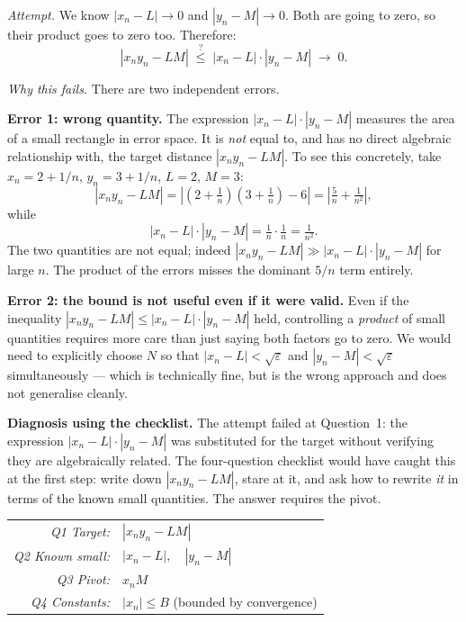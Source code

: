 \begin{tcolorbox}[colback=red!4, colframe=red!40, arc=2pt,
  left=8pt, right=8pt, top=6pt, bottom=6pt,
  title={\small\textbf{First attempt (incorrect)}},
  fonttitle=\small\bfseries]
\textit{Attempt.}
We know $|x_n - L| \to 0$ and $|y_n - M| \to 0$.
Both are going to zero, so their product goes to zero too.
Therefore:
\[
  |x_n y_n - LM| \;\stackrel{?}{\le}\; |x_n - L| \cdot |y_n - M| \;\to\; 0.
\]

\medskip

\textit{Why this fails.}
There are two independent errors.

\textbf{Error 1: wrong quantity.}
The expression $|x_n - L| \cdot |y_n - M|$ measures the area of
a small rectangle in error space.
It is \emph{not} equal to, and has no direct algebraic relationship with,
the target distance $|x_n y_n - LM|$.
To see this concretely, take $x_n = 2 + 1/n$, $y_n = 3 + 1/n$,
$L = 2$, $M = 3$:
\[
  |x_n y_n - LM|
  = \left|(2+\tfrac{1}{n})(3+\tfrac{1}{n}) - 6\right|
  = \left|\tfrac{5}{n} + \tfrac{1}{n^2}\right|,
\]
while
\[
  |x_n - L|\cdot|y_n - M| = \tfrac{1}{n} \cdot \tfrac{1}{n} = \tfrac{1}{n^2}.
\]
The two quantities are not equal; indeed $|x_n y_n - LM| \gg |x_n - L|\cdot|y_n - M|$
for large $n$.
The product of the errors misses the dominant $5/n$ term entirely.

\textbf{Error 2: the bound is not useful even if it were valid.}
Even if the inequality $|x_n y_n - LM| \le |x_n - L| \cdot |y_n - M|$ held,
controlling a \emph{product} of small quantities requires more care
than just saying both factors go to zero.
We would need to explicitly choose $N$ so that
$|x_n - L| < \sqrt{\varepsilon}$ and $|y_n - M| < \sqrt{\varepsilon}$
simultaneously --- which is technically fine, but is the wrong approach
and does not generalise cleanly.
\end{tcolorbox}

\medskip

\noindent\textbf{Diagnosis using the checklist.}
The attempt failed at Question~1: the expression $|x_n - L|\cdot|y_n - M|$
was substituted for the target without verifying they are algebraically
related.
The four-question checklist would have caught this at the first step:
write down $|x_n y_n - LM|$, stare at it, and ask how to rewrite
\emph{it} in terms of the known small quantities.
The answer requires the pivot.

\medskip

\begin{center}
\renewcommand{\arraystretch}{1.3}
\begin{tabular}{r l}
\toprule
\textit{Q1 Target:} & $|x_n y_n - LM|$ \\
\textit{Q2 Known small:} & $|x_n-L|,\quad |y_n-M|$ \\
\textit{Q3 Pivot:} & $x_n M$ \\
\textit{Q4 Constants:} & $|x_n| \le B$ (bounded by convergence) \\
\bottomrule
\end{tabular}
\end{center}

